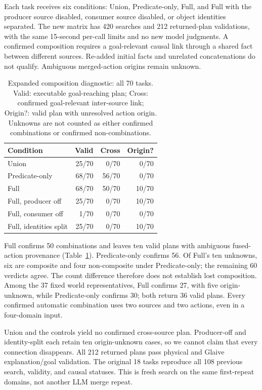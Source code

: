 Each task receives six conditions: Union, Predicate-only, Full, and Full with the producer source disabled, consumer source disabled, or object identities separated. The new matrix has 420 searches and 212 returned-plan validations, with the same 15-second per-call limits and no new model judgments. A confirmed composition requires a goal-relevant causal link through a shared fact between different sources. Re-added initial facts and unrelated concatenations do not qualify. Ambiguous merged-action origins remain unknown.

\begin{table}[t]
\centering
\caption{Expanded composition diagnostic: all 70 tasks. Valid: executable goal-reaching plan; Cross: confirmed goal-relevant inter-source link; Origin?: valid plan with unresolved action origin. Unknowns are not counted as either confirmed combinations or confirmed non-combinations.}
\label{tab:revised-composition}
\begin{tabular}{lrrr}
\toprule
Condition & Valid & Cross & Origin?\\
\midrule
Union & 25/70 & 0/70 & 0/70\\
Predicate-only & 68/70 & 56/70 & 0/70\\
Full & 68/70 & 50/70 & 10/70\\
Full, producer off & 25/70 & 0/70 & 10/70\\
Full, consumer off & 1/70 & 0/70 & 0/70\\
Full, identities split & 25/70 & 0/70 & 10/70\\
\bottomrule
\end{tabular}
\end{table}

Full confirms 50 combinations and leaves ten valid plans with ambiguous fused-action provenance (Table~\ref{tab:revised-composition}). Predicate-only confirms 56. Of Full's ten unknowns, six are composite and four non-composite under Predicate-only; the remaining 60 verdicts agree. The count difference therefore does not establish lost composition. Among the 37 fixed world representatives, Full confirms 27, with five origin-unknown, while Predicate-only confirms 30; both return 36 valid plans. Every confirmed automatic combination uses two sources and two actions, even in a four-domain input.

Union and the controls yield no confirmed cross-source plan. Producer-off and identity-split each retain ten origin-unknown cases, so we cannot claim that every connection disappears. All 212 returned plans pass physical and Glaive explanation/goal validation. The original 18 tasks reproduce all 108 previous search, validity, and causal statuses. This is fresh search on the same first-repeat domains, not another LLM merge repeat.

